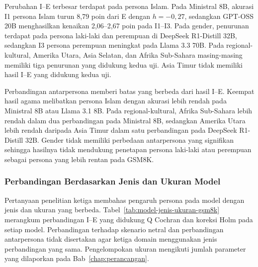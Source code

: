 Perubahan I--E terbesar terdapat pada persona Islam. Pada Ministral 8B,
akurasi I1 persona Islam turun 8,79 poin dari E dengan $h=-0{,}27$, sedangkan
GPT-OSS 20B menghasilkan kenaikan 2,06--2,67 poin pada I1--I3. Pada gender,
penurunan terdapat pada persona laki-laki dan perempuan di DeepSeek R1-Distill
32B, sedangkan I3 persona perempuan meningkat pada Llama 3.3 70B. Pada
regional-kultural, Amerika Utara, Asia Selatan, dan Afrika Sub-Sahara
masing-masing memiliki tiga penurunan yang didukung kedua uji. Asia Timur tidak
memiliki hasil I--E yang didukung kedua uji.

Perbandingan antarpersona memberi batas yang berbeda dari hasil I--E.
Keempat hasil agama melibatkan persona Islam dengan akurasi lebih rendah pada
Ministral 8B atau Llama 3.1 8B. Pada regional-kultural, Afrika Sub-Sahara lebih
rendah dalam dua perbandingan pada Ministral 8B, sedangkan Amerika Utara lebih
rendah daripada Asia Timur dalam satu perbandingan pada DeepSeek R1-Distill
32B. Gender tidak memiliki perbedaan antarpersona yang signifikan sehingga hasilnya
tidak mendukung penetapan persona laki-laki atau perempuan sebagai persona yang
lebih rentan pada GSM8K.

\subsubsection{Perbandingan Berdasarkan Jenis dan Ukuran Model}
\label{subsubsec:jenis-ukuran-model-gsm8k}

Pertanyaan penelitian ketiga membahas pengaruh persona pada model dengan
jenis dan ukuran yang berbeda. Tabel~\ref{tab:model-jenis-ukuran-gsm8k}
merangkum perbandingan I--E yang didukung Q Cochran dan koreksi Holm pada setiap
model. Perbandingan terhadap skenario netral dan perbandingan antarpersona tidak
disertakan agar ketiga domain menggunakan jenis perbandingan yang sama.
Pengelompokan ukuran mengikuti jumlah parameter yang dilaporkan pada
Bab~\ref{chap:perancangan}.

